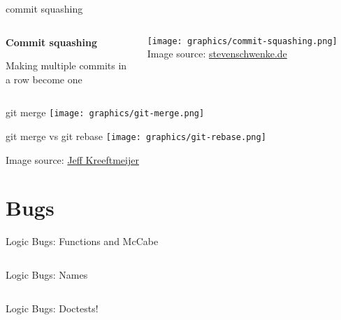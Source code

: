 \documentclass{beamer}
\begin{document}
\begin{frame}{commit squashing}
    \begin{columns}
        \begin{column}{0.5\textwidth}
            \textbf{Commit squashing}

            Making multiple commits in a row become one
        \end{column}
        \begin{column}{0.5\textwidth}
            \texttt{[image: graphics/commit-squashing.png]}
            {\small Image source: \href{https://stevenschwenke.de/GitToSquashOrNotToSquash}{stevenschwenke.de}}
        \end{column}
    \end{columns}
\end{frame}

\begin{frame}{git merge}
    \texttt{[image: graphics/git-merge.png]}
\end{frame}

\begin{frame}{git merge vs git rebase}
    \texttt{[image: graphics/git-rebase.png]}

    {\small Image source: \href{https://jeffkreeftmeijer.com/git-rebase/}{Jeff Kreeftmeijer}}
\end{frame}


\section{Bugs}
\begin{frame}{Logic Bugs: Functions and McCabe}
\inputminted[linenos,
             numbersep=7pt,
             fontsize=\footnotesize, tabsize=4]{python}{src/sieve-v1.py}
\end{frame}

\begin{frame}{Logic Bugs: Names}
\inputminted[linenos,
             numbersep=7pt,
             fontsize=\footnotesize, tabsize=4,
             firstline=4]{python}{src/sieve-v2.py}
\end{frame}

\begin{frame}{Logic Bugs: Doctests!}
\inputminted[linenos,
               numbersep=7pt,
                fontsize=\footnotesize, tabsize=4,
                firstline=8, lastline=24]{python}{src/sieve-v3.py}
\end{frame}
\end{document}
